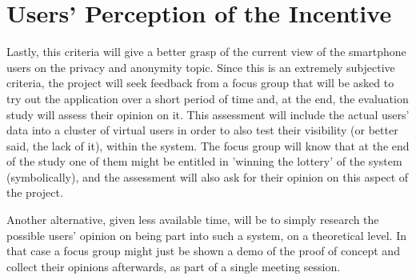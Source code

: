 \section{Users' Perception of the Incentive}
Lastly, this criteria will give a better grasp of the current view of the smartphone users on the privacy and anonymity topic. Since this is an extremely subjective criteria, the project will seek feedback from a focus group that will be asked to try out the application over a short period of time and, at the end, the evaluation study will assess their opinion on it. This assessment will include the actual users' data into a cluster of virtual users in order to also test their visibility (or better said, the lack of it), within the system. The focus group will know that at the end of the study one of them might be entitled in 'winning the lottery' of the system (symbolically), and the assessment will also ask for their opinion on this aspect of the project.

Another alternative, given less available time, will be to simply research the possible users' opinion on being part into such a system, on a theoretical level. In that case a focus group might just be shown a demo of the proof of concept and collect their opinions afterwards, as part of a single meeting session.